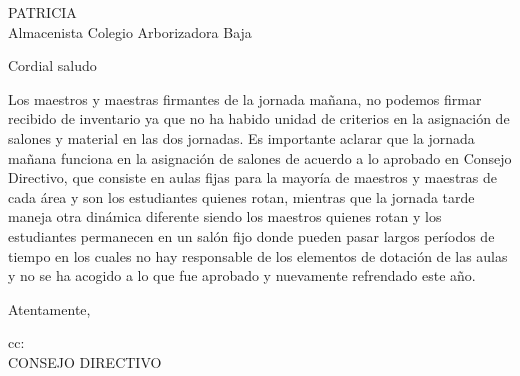 \documentclass[letterpaper,spanish]{letter}
\date{6 de noviembre de 2015}
\begin{document}
\begin{letter}{PATRICIA \\Almacenista Colegio Arborizadora Baja}
	
\opening{Cordial saludo}
Los maestros y maestras firmantes de la jornada mañana, no podemos firmar recibido de inventario ya que no ha habido unidad de criterios en la asignación de salones y material en las dos jornadas. Es importante aclarar que la jornada mañana funciona en la asignación de salones de acuerdo a lo aprobado en Consejo Directivo, que consiste en aulas fijas para la mayoría de maestros y maestras de cada área y son los estudiantes quienes rotan, mientras que la jornada tarde maneja otra dinámica diferente siendo los maestros quienes rotan y los estudiantes permanecen en un salón fijo donde pueden pasar largos períodos de tiempo en los cuales no hay responsable de los elementos de dotación de las aulas y no se ha acogido a lo que fue aprobado y nuevamente refrendado este año.
\closing{Atentamente,}

cc{:\\CONSEJO DIRECTIVO}

\end{letter}
\end{document}
